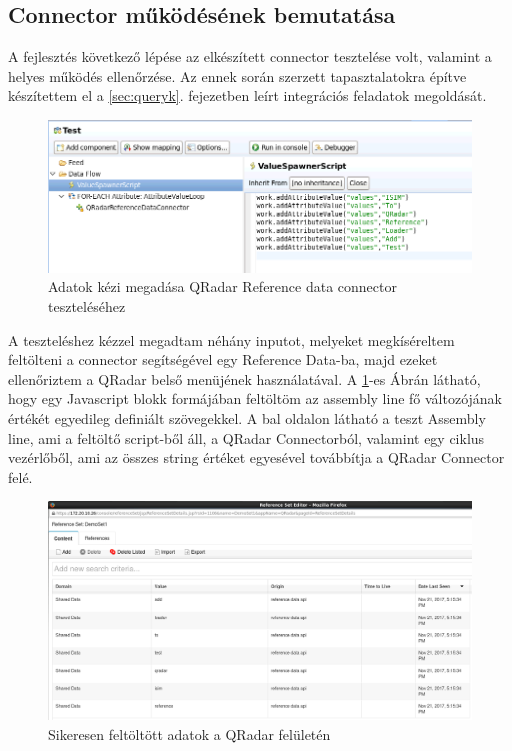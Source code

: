 \subsection{Connector működésének bemutatása}
A fejlesztés következő lépése az elkészített connector tesztelése volt, valamint a helyes működés ellenőrzése. Az ennek során szerzett tapasztalatokra építve készítettem el a \ref{sec:queryk}.  fejezetben leírt integrációs feladatok megoldását.
 \begin{figure}[t]
	\centering
	
	\includegraphics[width=1.0\linewidth]{figures/conn_test/connTest1}
	\caption{Adatok kézi megadása QRadar Reference data connector teszteléséhez}
	\label{fig:conntest1}
\end{figure}
A teszteléshez kézzel megadtam néhány inputot, melyeket megkíséreltem feltölteni a connector segítségével egy Reference Data-ba, majd ezeket ellenőriztem a QRadar belső menüjének használatával.
A  \ref{fig:conntest1}-es Ábrán látható, hogy egy Javascript blokk formájában feltöltöm az assembly line fő változójának értékét egyedileg definiált szövegekkel. A bal oldalon látható a teszt Assembly line, ami a feltöltő script-ből áll, a QRadar Connectorból, valamint egy ciklus vezérlőből, ami az összes string értéket egyesével továbbítja a QRadar Connector felé. 
 
 \begin{figure}
 	\centering
 	\includegraphics[width=1.0\linewidth]{figures/conn_test/qradarTest1}
 	\caption{Sikeresen feltöltött adatok a QRadar felületén}
 	\label{fig:qradartest1}
 \end{figure}
 
